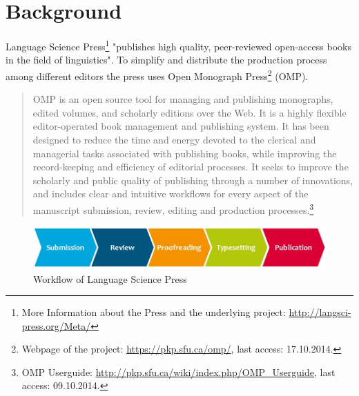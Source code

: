 




 
\chapter{Background} \label{sec:intro}

Language Science Press\footnote{More Information about the Press and the underlying project: \url{http://langsci-press.org/Meta/}} "publishes high quality, peer-reviewed open-access books in the field of linguistics". To simplify and distribute the production process among different editors the press uses Open Monograph Press\footnote{Webpage of the project: \url{https://pkp.sfu.ca/omp/}, last access: 17.10.2014.} (OMP).

\begin{quote}
OMP is an open source tool for managing and publishing monographs, edited volumes, and scholarly editions over the Web. It is a highly flexible editor-operated book management and publishing system. It has been designed to reduce the time and energy devoted to the clerical and managerial tasks associated with publishing books, while improving the record-keeping and efficiency of editorial processes. It seeks to improve the scholarly and public quality of publishing through a number of innovations, and includes clear and intuitive workflows for every aspect of the manuscript submission, review, editing and production processes.\footnote{OMP Userguide: \url{http://pkp.sfu.ca/wiki/index.php/OMP_Userguide}, last access: 09.10.2014.}
\end{quote}

\begin{figure}[h] \centering
\includegraphics[width=\textwidth]{./img/workflow.jpg}
\caption{Workflow of Language Science Press}
\label{fig:workflow}
\end{figure}

